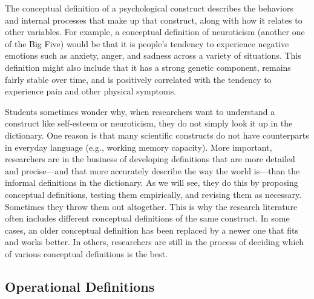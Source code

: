 The conceptual definition of a psychological construct describes the behaviors and internal processes that make up that construct, along with how it relates to other variables. For example, a conceptual definition of neuroticism (another one of the Big Five) would be that it is people's tendency to experience negative emotions such as anxiety, anger, and sadness across a variety of situations. This definition might also include that it has a strong genetic component, remains fairly stable over time, and is positively correlated with the tendency to experience pain and other physical symptoms.

Students sometimes wonder why, when researchers want to understand a construct like self-esteem or neuroticism, they do not simply look it up in the dictionary. One reason is that many scientific constructs do not have counterparts in everyday language (e.g., working memory capacity). More important, researchers are in the business of developing definitions that are more detailed and precise—and that more accurately describe the way the world is—than the informal definitions in the dictionary. As we will see, they do this by proposing conceptual definitions, testing them empirically, and revising them as necessary. Sometimes they throw them out altogether. This is why the research literature often includes different conceptual definitions of the same construct. In some cases, an older conceptual definition has been replaced by a newer one that fits and works better. In others, researchers are still in the process of deciding which of various conceptual definitions is the best.

\subsection{Operational Definitions}

